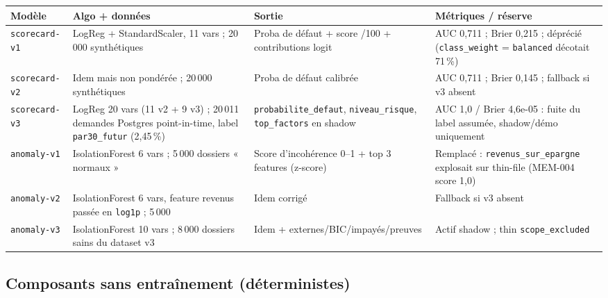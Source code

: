 \documentclass[11pt,a4paper]{article}
\begin{document}
\begin{center}
\footnotesize
\renewcommand{\arraystretch}{1.3}
\begin{tabularx}{\linewidth}{>{\raggedright\arraybackslash}p{2.5cm}>{\raggedright\arraybackslash}p{4.3cm}>{\raggedright\arraybackslash}X>{\raggedright\arraybackslash}p{3.4cm}}
\toprule
\textbf{Modèle} & \textbf{Algo + données} & \textbf{Sortie} & \textbf{Métriques / réserve} \\
\midrule
\texttt{scorecard-v1} & LogReg + StandardScaler, 11 vars ; 20\,000 synthétiques & Proba de défaut + score /100 + contributions logit & AUC 0,711 ; Brier 0,215 ; déprécié (\texttt{class\_weight} = \texttt{balanced} décotait 71\,\%) \\
\texttt{scorecard-v2} & Idem mais non pondérée ; 20\,000 synthétiques & Proba de défaut calibrée & AUC 0,711 ; Brier 0,145 ; fallback si v3 absent \\
\texttt{scorecard-v3} & LogReg 20 vars (11 v2 + 9 v3) ; 20\,011 demandes Postgres point-in-time, label \texttt{par30\_futur} (2,45\,\%) & \texttt{probabilite\_defaut}, \texttt{niveau\_risque}, \texttt{top\_factors} en shadow & AUC 1,0 / Brier 4,6e-05 : fuite du label assumée, shadow/démo uniquement \\
\texttt{anomaly-v1} & IsolationForest 6 vars ; 5\,000 dossiers « normaux » & Score d'incohérence 0--1 + top 3 features (z-score) & Remplacé : \texttt{revenus\_sur\_epargne} explosait sur thin-file (MEM-004 score 1,0) \\
\texttt{anomaly-v2} & IsolationForest 6 vars, feature revenus passée en \texttt{log1p} ; 5\,000 & Idem corrigé & Fallback si v3 absent \\
\texttt{anomaly-v3} & IsolationForest 10 vars ; 8\,000 dossiers sains du dataset v3 & Idem + externes/BIC/impayés/preuves & Actif shadow ; thin \texttt{scope\_excluded} \\
\bottomrule
\end{tabularx}
\end{center}

\subsection{Composants sans entraînement (déterministes)}
\end{document}
